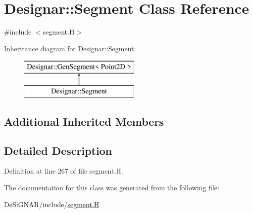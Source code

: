 \hypertarget{class_designar_1_1_segment}{}\section{Designar\+:\+:Segment Class Reference}
\label{class_designar_1_1_segment}


{\ttfamily \#include $<$segment.\+H$>$}

Inheritance diagram for Designar\+:\+:Segment\+:\begin{figure}[H]
\begin{center}
\leavevmode
\includegraphics[height=2.000000cm]{class_designar_1_1_segment}
\end{center}
\end{figure}
\subsection*{Additional Inherited Members}


\subsection{Detailed Description}


Definition at line 267 of file segment.\+H.



The documentation for this class was generated from the following file\+:\begin{DoxyCompactItemize}
\item 
De\+Si\+G\+N\+A\+R/include/\hyperlink{segment_8_h}{segment.\+H}\end{DoxyCompactItemize}
